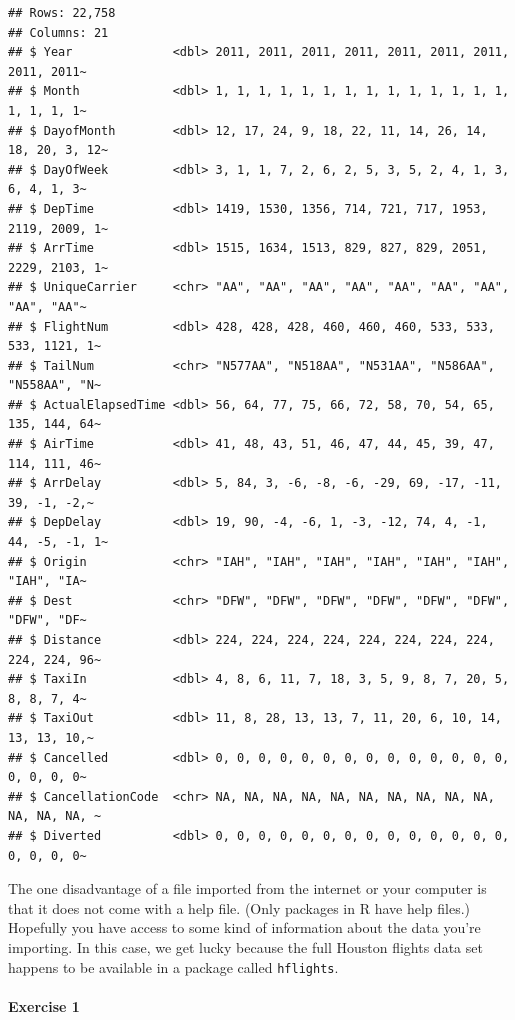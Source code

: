 \documentclass[
]{book}
\begin{document}
\begin{verbatim}
## Rows: 22,758
## Columns: 21
## $ Year              <dbl> 2011, 2011, 2011, 2011, 2011, 2011, 2011, 2011, 2011~
## $ Month             <dbl> 1, 1, 1, 1, 1, 1, 1, 1, 1, 1, 1, 1, 1, 1, 1, 1, 1, 1~
## $ DayofMonth        <dbl> 12, 17, 24, 9, 18, 22, 11, 14, 26, 14, 18, 20, 3, 12~
## $ DayOfWeek         <dbl> 3, 1, 1, 7, 2, 6, 2, 5, 3, 5, 2, 4, 1, 3, 6, 4, 1, 3~
## $ DepTime           <dbl> 1419, 1530, 1356, 714, 721, 717, 1953, 2119, 2009, 1~
## $ ArrTime           <dbl> 1515, 1634, 1513, 829, 827, 829, 2051, 2229, 2103, 1~
## $ UniqueCarrier     <chr> "AA", "AA", "AA", "AA", "AA", "AA", "AA", "AA", "AA"~
## $ FlightNum         <dbl> 428, 428, 428, 460, 460, 460, 533, 533, 533, 1121, 1~
## $ TailNum           <chr> "N577AA", "N518AA", "N531AA", "N586AA", "N558AA", "N~
## $ ActualElapsedTime <dbl> 56, 64, 77, 75, 66, 72, 58, 70, 54, 65, 135, 144, 64~
## $ AirTime           <dbl> 41, 48, 43, 51, 46, 47, 44, 45, 39, 47, 114, 111, 46~
## $ ArrDelay          <dbl> 5, 84, 3, -6, -8, -6, -29, 69, -17, -11, 39, -1, -2,~
## $ DepDelay          <dbl> 19, 90, -4, -6, 1, -3, -12, 74, 4, -1, 44, -5, -1, 1~
## $ Origin            <chr> "IAH", "IAH", "IAH", "IAH", "IAH", "IAH", "IAH", "IA~
## $ Dest              <chr> "DFW", "DFW", "DFW", "DFW", "DFW", "DFW", "DFW", "DF~
## $ Distance          <dbl> 224, 224, 224, 224, 224, 224, 224, 224, 224, 224, 96~
## $ TaxiIn            <dbl> 4, 8, 6, 11, 7, 18, 3, 5, 9, 8, 7, 20, 5, 8, 8, 7, 4~
## $ TaxiOut           <dbl> 11, 8, 28, 13, 13, 7, 11, 20, 6, 10, 14, 13, 13, 10,~
## $ Cancelled         <dbl> 0, 0, 0, 0, 0, 0, 0, 0, 0, 0, 0, 0, 0, 0, 0, 0, 0, 0~
## $ CancellationCode  <chr> NA, NA, NA, NA, NA, NA, NA, NA, NA, NA, NA, NA, NA, ~
## $ Diverted          <dbl> 0, 0, 0, 0, 0, 0, 0, 0, 0, 0, 0, 0, 0, 0, 0, 0, 0, 0~
\end{verbatim}

The one disadvantage of a file imported from the internet or your computer is that it does not come with a help file. (Only packages in R have help files.) Hopefully you have access to some kind of information about the data you're importing. In this case, we get lucky because the full Houston flights data set happens to be available in a package called \texttt{hflights}.

\hypertarget{exercise-1-2}{%
\paragraph*{Exercise 1}\label{exercise-1-2}}
\end{document}
